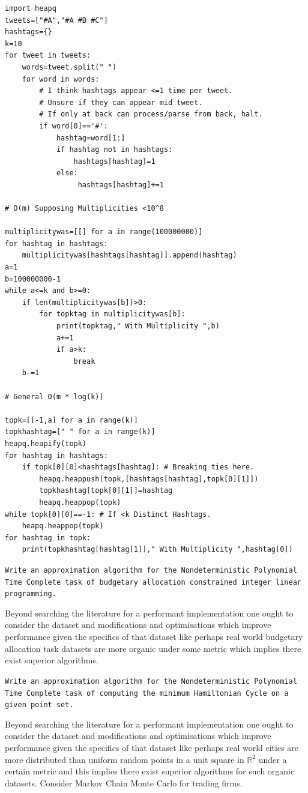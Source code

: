\begin{verbatim}
import heapq
tweets=["#A","#A #B #C"]
hashtags={}
k=10
for tweet in tweets:
    words=tweet.split(" ")
    for word in words:
        # I think hashtags appear <=1 time per tweet.
        # Unsure if they can appear mid tweet.
        # If only at back can process/parse from back, halt.
        if word[0]=='#':
            hashtag=word[1:]
            if hashtag not in hashtags:
                hashtags[hashtag]=1
            else:
                 hashtags[hashtag]+=1

# O(m) Supposing Multiplicities <10^8

multiplicitywas=[[] for a in range(100000000)]
for hashtag in hashtags:
    multiplicitywas[hashtags[hashtag]].append(hashtag)
a=1
b=100000000-1
while a<=k and b>=0:
	if len(multiplicitywas[b])>0:
        for topktag in multiplicitywas[b]:
            print(topktag," With Multiplicity ",b)
            a+=1
            if a>k:
                break
    b-=1

# General O(m * log(k))

topk=[[-1,a] for a in range(k)]
topkhashtag=[" " for a in range(k)]
heapq.heapify(topk)
for hashtag in hashtags:
    if topk[0][0]<hashtags[hashtag]: # Breaking ties here.
        heapq.heappush(topk,[hashtags[hashtag],topk[0][1]])
        topkhashtag[topk[0][1]]=hashtag
        heapq.heappop(topk)
while topk[0][0]==-1: # If <k Distinct Hashtags.
    heapq.heappop(topk)
for hashtag in topk:
    print(topkhashtag[hashtag[1]]," With Multiplicity ",hashtag[0])
\end{verbatim}

\texttt{Write an approximation algorithm for the Nondeterministic Polynomial Time Complete task of budgetary allocation constrained integer linear programming.}

Beyond searching the literature for a performant implementation one ought to consider the dataset and modifications and optimisations which improve performance given the specifics of that dataset like perhaps real world budgetary allocation task datasets are more organic under some metric which implies there exist superior algorithms.

\texttt{Write an approximation algorithm for the Nondeterministic Polynomial Time Complete task of computing the minimum Hamiltonian Cycle on a given point set.}

Beyond searching the literature for a performant implementation one ought to consider the dataset and modifications and optimisations which improve performance given the specifics of that dataset like perhaps real world cities are more distributed than uniform random points in a unit square in $\mathbb{R}^2$ under a certain metric and this implies there exist superior algorithms for such organic datasets. Consider Markov Chain Monte Carlo for trading firms.

